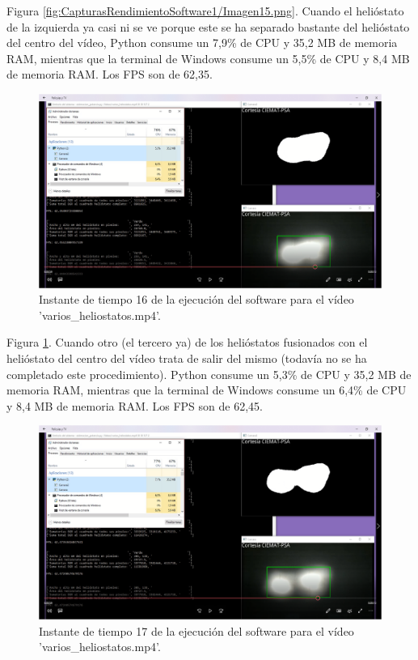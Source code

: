 Figura \ref{fig:CapturasRendimientoSoftware1/Imagen15.png}. Cuando el helióstato de la izquierda ya casi ni se ve porque este se ha separado bastante del helióstato del centro del vídeo, Python consume un 7,9\% de CPU y 35,2 MB de memoria RAM, mientras que la terminal de Windows consume un 5,5\% de CPU y 8,4 MB de memoria RAM. Los FPS son de 62,35.\\[20pt]

\begin{figure}[h!]
  	\centering
	\includegraphics[width=\textwidth]{CapturasRendimientoSoftware1/Imagen16.png}
	\caption{Instante de tiempo 16 de la ejecución del software para el vídeo 'varios\_heliostatos.mp4'.
	\label{fig:CapturasRendimientoSoftware1/Imagen16.png}}
\end{figure}

Figura \ref{fig:CapturasRendimientoSoftware1/Imagen16.png}. Cuando otro (el tercero ya) de los helióstatos fusionados con el helióstato del centro del vídeo trata de salir del mismo (todavía no se ha completado este procedimiento). Python consume un 5,3\% de CPU y 35,2 MB de memoria RAM, mientras que la terminal de Windows consume un 6,4\% de CPU y 8,4 MB de memoria RAM. Los FPS son de 62,45.\\[20pt]

\begin{figure}[h!]
  	\centering
	\includegraphics[width=\textwidth]{CapturasRendimientoSoftware1/Imagen17.png}
	\caption{Instante de tiempo 17 de la ejecución del software para el vídeo 'varios\_heliostatos.mp4'.
	\label{fig:CapturasRendimientoSoftware1/Imagen17.png}}
\end{figure}

